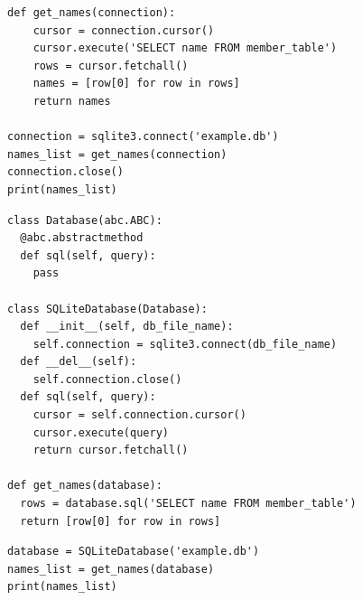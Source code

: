 \documentclass[calcdimensions,landscape,letterpaper]{powersem}
\newcommand{\thecurrentheading}{}
\newcommand{\heading}[1]{\renewcommand{\thecurrentheading}{#1}}
\begin{document}
\begin{slide}
  \heading{Dependency Inversion - Before}
  \begin{center}
    \begin{verbatim}
def get_names(connection):
    cursor = connection.cursor()
    cursor.execute('SELECT name FROM member_table')
    rows = cursor.fetchall()
    names = [row[0] for row in rows]
    return names

connection = sqlite3.connect('example.db')
names_list = get_names(connection)
connection.close()
print(names_list)
    \end{verbatim}
  \end{center}
\end{slide}

\begin{slide}
  \heading{Dependency Inversion - After}
  \begin{center}
    \begin{verbatim}
class Database(abc.ABC):
  @abc.abstractmethod
  def sql(self, query):
    pass

class SQLiteDatabase(Database):
  def __init__(self, db_file_name):
    self.connection = sqlite3.connect(db_file_name)
  def __del__(self):
    self.connection.close()
  def sql(self, query):
    cursor = self.connection.cursor()
    cursor.execute(query)
    return cursor.fetchall()

def get_names(database):
  rows = database.sql('SELECT name FROM member_table')
  return [row[0] for row in rows]
    \end{verbatim}
  \end{center}
\end{slide}

\begin{slide}
  \heading{Dependency Inversion - After}
  \begin{center}
    \begin{verbatim}
database = SQLiteDatabase('example.db')
names_list = get_names(database)
print(names_list)
    \end{verbatim}
  \end{center}
\end{slide}
\end{document}
